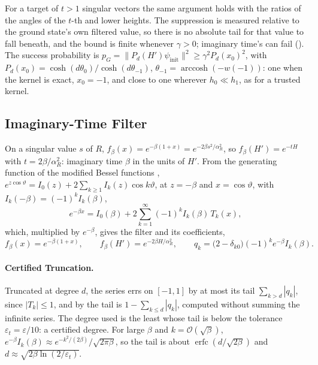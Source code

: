 For a target of $t>1$ singular vectors the same argument holds with the ratios of the angles of the $t$-th and lower heights. The suppression is measured relative to the ground state's own filtered value, so there is no absolute tail for that value to fall beneath, and the bound is finite whenever $\gamma>0$; imaginary time's can fail (). The success probability is $p_G=\|P_d(H')\psi_{\mathrm{init}}\|^2\ge\gamma^2P_d(x_0)^2$, with $P_d(x_0)=\cosh(d\theta_0)/\cosh(d\theta_{-1})$, $\theta_{-1}=\operatorname{arccosh}(-w(-1))$: one when the kernel is exact, $x_0=-1$, and close to one wherever $h_0\ll h_1$, as for a trusted kernel.

\subsection{Imaginary-Time Filter}
\label{app:qite-filter}

On a singular value $s$ of $R$, $f_\beta(x)=e^{-\beta(1+x)}=e^{-2\beta s^2/\alpha_R^2}$, so $f_\beta(H')=e^{-tH}$ with $t=2\beta/\alpha_R^2$: imaginary time $\beta$ in the units of $H'$. From the generating function of the modified Bessel functions \cite{abramowitz1964handbook}, $e^{z\cos\vartheta}=I_0(z)+2\sum_{k\ge1}I_k(z)\cos k\vartheta$, at $z=-\beta$ and $x=\cos\vartheta$, with $I_k(-\beta)=(-1)^kI_k(\beta)$,
\begin{equation}
    e^{-\beta x}=I_0(\beta)+2\sum_{k=1}^{\infty}(-1)^kI_k(\beta)\,T_k(x),
    \label{eq:bessel-expansion}
\end{equation}
which, multiplied by $e^{-\beta}$, gives the filter and its coefficients,
\begin{equation}
    f_\beta(x)=e^{-\beta(1+x)},
    \qquad
    f_\beta(H')=e^{-2\beta H/\alpha_R^2},
    \qquad
    q_k=\bigl(2-\delta_{k0}\bigr)(-1)^k e^{-\beta} I_k(\beta).
    \label{eq:qite-filter}
\end{equation}

\paragraph{Certified Truncation.} Truncated at degree $d$, the series errs on $[-1,1]$ by at most its tail $\sum_{k>d}|q_k|$, since $|T_k|\le1$, and by  the tail is $1-\sum_{k\le d}|q_k|$, computed without summing the infinite series. The degree used is the least whose tail is below the tolerance $\varepsilon_t=\varepsilon/10$: a certified degree. For large $\beta$ and $k=\mathcal{O}(\sqrt\beta)$, $e^{-\beta}I_k(\beta)\approx e^{-k^2/(2\beta)}/\sqrt{2\pi\beta}$, so the tail is about $\operatorname{erfc}(d/\sqrt{2\beta})$ and $d\approx\sqrt{2\beta\ln(2/\varepsilon_t)}$.

